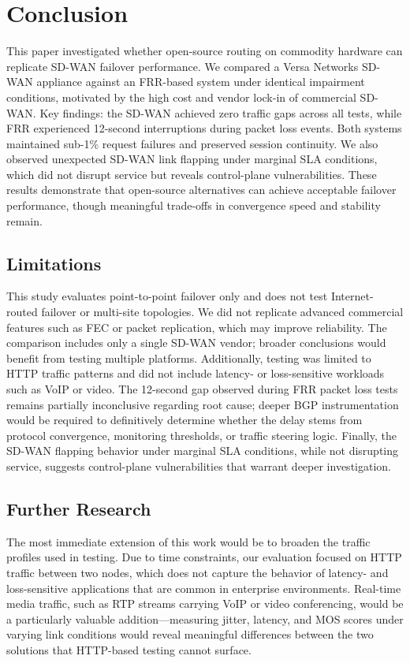 \documentclass[conference]{IEEEtran}
\begin{document}
\section{Conclusion}

This paper investigated whether open-source routing on commodity hardware can replicate SD-WAN failover performance. We compared a Versa Networks SD-WAN appliance against an FRR-based system under identical impairment conditions, motivated by the high cost and vendor lock-in of commercial SD-WAN. Key findings: the SD-WAN achieved zero traffic gaps across all tests, while FRR experienced 12-second interruptions during packet loss events. Both systems maintained sub-1\% request failures and preserved session continuity. We also observed unexpected SD-WAN link flapping under marginal SLA conditions, which did not disrupt service but reveals control-plane vulnerabilities. These results demonstrate that open-source alternatives can achieve acceptable failover performance, though meaningful trade-offs in convergence speed and stability remain.

\subsection{Limitations}

This study evaluates point-to-point failover only and does not test Internet-routed failover or multi-site topologies. We did not replicate advanced commercial features such as FEC or packet replication, which may improve reliability. The comparison includes only a single SD-WAN vendor; broader conclusions would benefit from testing multiple platforms. Additionally, testing was limited to HTTP traffic patterns and did not include latency- or loss-sensitive workloads such as VoIP or video. The 12-second gap observed during FRR packet loss tests remains partially inconclusive regarding root cause; deeper BGP instrumentation would be required to definitively determine whether the delay stems from protocol convergence, monitoring thresholds, or traffic steering logic. Finally, the SD-WAN flapping behavior under marginal SLA conditions, while not disrupting service, suggests control-plane vulnerabilities that warrant deeper investigation. 

\subsection{Further Research}

The most immediate extension of this work would be to broaden the traffic profiles used in testing. Due to time constraints, our evaluation focused on HTTP traffic between two nodes, which does not capture the behavior of latency- and loss-sensitive applications that are common in enterprise environments. Real-time media traffic, such as RTP streams carrying VoIP or video conferencing, would be a particularly valuable addition—measuring jitter, latency, and MOS scores under varying link conditions would reveal meaningful differences between the two solutions that HTTP-based testing cannot surface.
\end{document}

